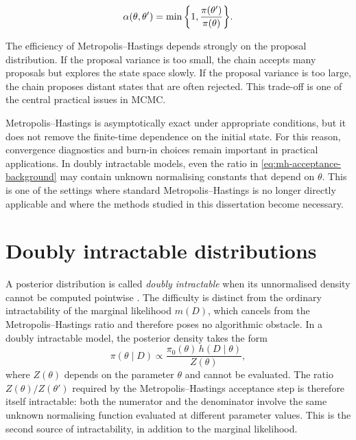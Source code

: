 \begin{equation}
    \alpha(\theta,\theta')
    =
    \min\qty{
    1,
    \frac{\pi(\theta')}{\pi(\theta)}
    }.
    \label{eq:random-walk-acceptance-background}
\end{equation}

The efficiency of Metropolis--Hastings depends strongly on the proposal distribution.
If the proposal variance is too small, the chain accepts many proposals but explores the state space slowly.
If the proposal variance is too large, the chain proposes distant states that are often rejected.
This trade-off is one of the central practical issues in MCMC.

Metropolis--Hastings is asymptotically exact under appropriate conditions, but it does not remove the finite-time dependence on the initial state.
For this reason, convergence diagnostics and burn-in choices remain important in practical applications.
In doubly intractable models, even the ratio in \eqref{eq:mh-acceptance-background} may contain unknown normalising constants that depend on $\theta$.
This is one of the settings where standard Metropolis--Hastings is no longer directly applicable and where the methods studied in this dissertation become necessary.

\section{Doubly intractable distributions}
\label{sec:dbl-int}

A posterior distribution is called \textit{doubly intractable} when its unnormalised
density cannot be computed pointwise \cite{murray2012, park2020}.
The difficulty is distinct from the ordinary intractability of the marginal likelihood
$m(D)$, which cancels from the Metropolis--Hastings ratio and therefore poses no
algorithmic obstacle.
In a doubly intractable model, the posterior density takes the form
\begin{equation}
    \label{eq:doubly-intractable-general}
    \pi(\theta \mid D)
    \propto
    \frac{\pi_0(\theta)\, h(D \mid \theta)}{Z(\theta)},
\end{equation}
where $Z(\theta)$ depends on the parameter $\theta$
and cannot be evaluated.
The ratio $Z(\theta) / Z(\theta')$ required by the Metropolis--Hastings acceptance step
is therefore itself intractable: both the numerator and the denominator involve the same
unknown normalising function evaluated at different parameter values.
This is the second source of intractability, in addition to the marginal likelihood.

